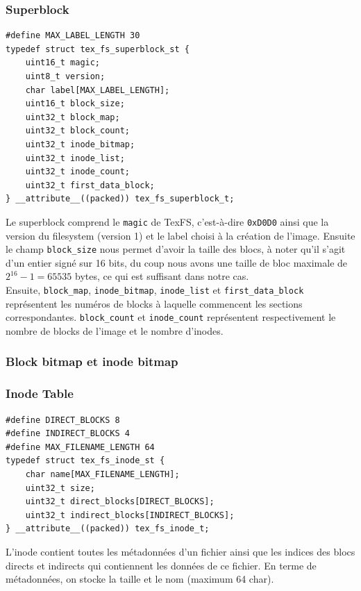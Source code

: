 \documentclass{article}
\begin{document}
\subsubsection{Superblock}
\begin{verbatim}
#define MAX_LABEL_LENGTH 30
typedef struct tex_fs_superblock_st {
    uint16_t magic;
    uint8_t version;
    char label[MAX_LABEL_LENGTH];
    uint16_t block_size;
    uint32_t block_map;
    uint32_t block_count;
    uint32_t inode_bitmap;
    uint32_t inode_list;
    uint32_t inode_count;
    uint32_t first_data_block;
} __attribute__((packed)) tex_fs_superblock_t;	
\end{verbatim}
Le superblock comprend le \verb+magic+ de TexFS, c'est-à-dire \verb+0xD0D0+ ainsi que la version du filesystem (version 1) et le label choisi à la création de l'image. Ensuite le champ \verb+block_size+ nous permet d'avoir la taille des blocs, à noter qu'il s'agit d'un entier signé sur 16 bits, du coup nous avons une taille de bloc maximale de $2^{16}-1=65535$ bytes, ce qui est suffisant dans notre cas. \\

Ensuite, \verb+block_map+, \verb+inode_bitmap+, \verb+inode_list+ et \verb+first_data_block+ représentent les numéros de blocks à laquelle commencent les sections correspondantes. \verb+block_count+ et \verb+inode_count+ représentent respectivement le nombre de blocks de l'image et le nombre d'inodes.
\subsubsection{Block bitmap et inode bitmap}

\subsubsection{Inode Table}
\begin{verbatim}
#define DIRECT_BLOCKS 8
#define INDIRECT_BLOCKS 4
#define MAX_FILENAME_LENGTH 64
typedef struct tex_fs_inode_st {
    char name[MAX_FILENAME_LENGTH];
    uint32_t size;
    uint32_t direct_blocks[DIRECT_BLOCKS];
    uint32_t indirect_blocks[INDIRECT_BLOCKS];
} __attribute__((packed)) tex_fs_inode_t;
\end{verbatim}
L'inode contient toutes les métadonnées d'un fichier ainsi que les indices des blocs directs et indirects qui contiennent les données de ce fichier. En terme de métadonnées, on stocke la taille et le nom (maximum 64 char). \\
\end{document}
